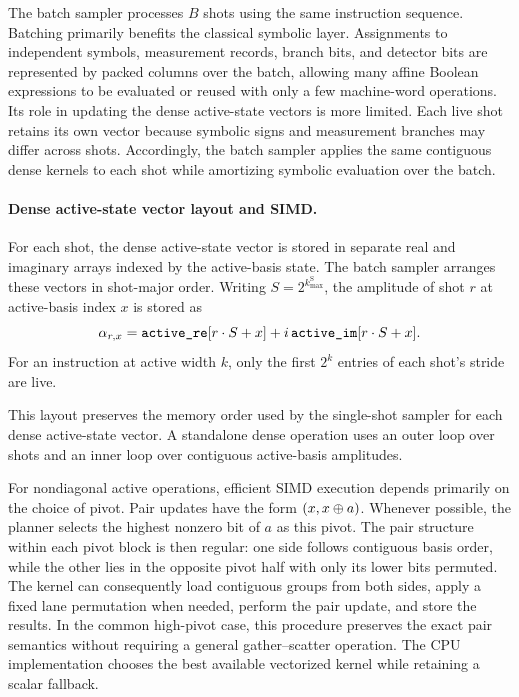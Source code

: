 \documentclass[a4paper,onecolumn,unpublished]{quantumarticle}
\DeclarePairedDelimiter\rbra{\lparen}{\rparen}
\DeclarePairedDelimiter\sbra{\lbrack}{\rbrack}
\begin{document}
The batch sampler processes $B$ shots using the same instruction sequence.
Batching primarily benefits the classical symbolic layer. Assignments to independent symbols, measurement records, branch bits, and detector bits are represented by packed columns over the batch, allowing many affine Boolean expressions to be evaluated or reused with only a few machine-word operations.
Its role in updating the dense active-state vectors is more limited.
Each live shot retains its own vector because symbolic signs and measurement branches may differ across shots.
Accordingly, the batch sampler applies the same contiguous dense kernels to each shot while amortizing symbolic evaluation over the batch.

\paragraph{Dense active-state vector layout and SIMD.}
For each shot, the dense active-state vector is stored in separate real and imaginary arrays indexed by the active-basis state.
The batch sampler arranges these vectors in shot-major order.
Writing $S = 2^{k_{\max}^{\mathrm S}}$, the amplitude of shot $r$ at active-basis index $x$ is stored as
\begin{equation*}
    \alpha_{r,x}
    =
    \texttt{active\_re}\sbra{r\cdot S+x}
    +
    i\,\texttt{active\_im}\sbra{r\cdot S+x}.
\end{equation*}
For an instruction at active width $k$, only the first $2^k$ entries of each shot's stride are live.

This layout preserves the memory order used by the single-shot sampler for each dense active-state vector.
A standalone dense operation uses an outer loop over shots and an inner loop over contiguous active-basis amplitudes.

For nondiagonal active operations, efficient SIMD execution depends primarily on the choice of pivot.
Pair updates have the form $\rbra{x,x\oplus a}$.
Whenever possible, the planner selects the highest nonzero bit of $a$ as this pivot.
The pair structure within each pivot block is then regular: one side follows contiguous basis order, while the other lies in the opposite pivot half with only its lower bits permuted.
The kernel can consequently load contiguous groups from both sides, apply a fixed lane permutation when needed, perform the pair update, and store the results.
In the common high-pivot case, this procedure preserves the exact pair semantics without requiring a general gather--scatter operation.
The CPU implementation chooses the best available vectorized kernel while retaining a scalar fallback.
\end{document}
